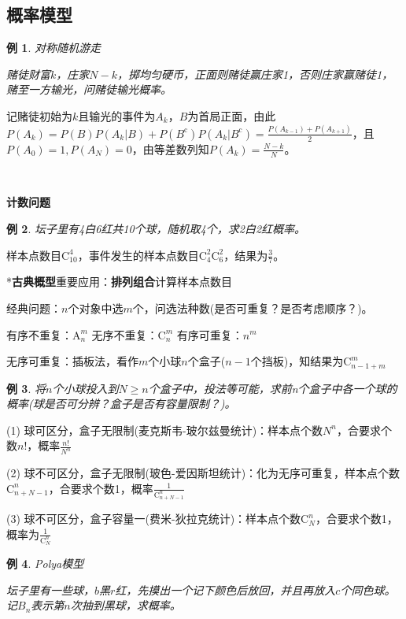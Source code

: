 \documentclass[a4paper,UTF8,fontset=windows]{ctexart}
\newtheorem{exmp}{例}[section]
\begin{document}
\subsection{概率模型}
\begin{exmp} 对称随机游走

赌徒财富$k$，庄家$N-k$，掷均匀硬币，正面则赌徒赢庄家1，否则庄家赢赌徒1，赌至一方输光，问赌徒输光概率。	
\end{exmp}

记赌徒初始为$k$且输光的事件为$A_k$，$B$为首局正面，由此$P(A_k)=P(B)P(A_k|B)+P(B^\mathrm{c})P(A_k|B^\mathrm{c})=\frac{P(A_{k-1})+P(A_{k+1})}{2}$，且$P(A_0)=1,P(A_N)=0$，由等差数列知$P(A_k)=\frac{N-k}{N}$。

~

\textbf{计数问题}

\begin{exmp}
坛子里有4白6红共10个球，随机取4个，求2白2红概率。
\end{exmp}

样本点数目$\mathrm{C}_{10}^4$，事件发生的样本点数目$\mathrm{C}_4^2\mathrm{C}_6^2$，结果为$\frac{3}{7}$。

*\textbf{古典概型}重要应用：\textbf{排列组合}计算样本点数目

经典问题：$n$个对象中选$m$个，问选法种数(是否可重复？是否考虑顺序？)。

有序不重复：$\mathrm{A}_n^m$
无序不重复：$\mathrm{C}_n^m$
有序可重复：$n^m$

无序可重复：插板法，看作$m$个小球$n$个盒子($n-1$个挡板)，知结果为$\mathrm{C}_{n-1+m}^m$

\begin{exmp}
将$n$个小球投入到$N\geq n$个盒子中，投法等可能，求前n个盒子中各一个球的概率(球是否可分辨？盒子是否有容量限制？)。
\end{exmp}

(1) 球可区分，盒子无限制(麦克斯韦-玻尔兹曼统计)：样本点个数$N^n$，合要求个数$n!$，概率$\frac{n!}{N^n}$

(2) 球不可区分，盒子无限制(玻色-爱因斯坦统计)：化为无序可重复，样本点个数$\mathrm{C}_{n+N-1}^n$，合要求个数1，概率$\frac{1}{\mathrm{C}_{n+N-1}^n}$

(3) 球不可区分，盒子容量一(费米-狄拉克统计)：样本点个数$\mathrm{C}_N^n$，合要求个数1，概率为$\frac{1}{\mathrm{C}_N^n}$

\begin{exmp} Polya模型
	
坛子里有一些球，$b$黑$r$红，先摸出一个记下颜色后放回，并且再放入$c$个同色球。记$B_n$表示第$n$次抽到黑球，求概率。
\end{exmp}
\end{document}
